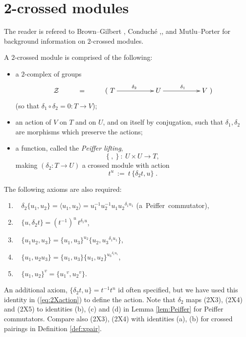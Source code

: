 
\section{2-crossed modules} \label{sect:2xmod}

The reader is refered to
Brown--Gilbert \cite{brow:gilb}, 
Conduch\'e \cite{conduche:jpaa},\cite{conduche:gmj}, 
and Mutlu--Porter \cite{mutlu:porter5} 
for background information on $2$-crossed modules.

\begin{defn} 
A $2$-crossed module is comprised of the following: 
\begin{itemize}
\item
a $2$-complex of groups
$$
\xymatrix{
\calZ 
  & = &  (~T \ar[rr]^{\delta_2} 
         &&  U \ar[rr]^{\delta_1}
             && V~) \\
}
$$
(so that  $\delta_1\circ\delta_2 = 0 : T \to V$);
\item
an action of $V$ on $T$ and on $U$, and on itself by conjugation,
such that $\delta_1, \delta_2$ are morphisms which preserve the actions;
\item
a function, called the \emph{Peiffer lifting},
$$
\{~,~\} ~:~ U \times U \to T,
$$
making $(\delta_2 : T \to U)$ a crossed module with action
\begin{equation} \label{eq:2Xaction}
t^u ~:=~ t\,\{\delta_2t,u\}\;.
\end{equation}
\end{itemize}
The following axioms are also required: 
\begin{enumerate}[{\rm (2X1)}]
\item~
$\delta_2\{u_1,u_2\} = \langle u_1, u_2 \rangle
                     = u_1^{-1} u_2^{-1} u_1 {u_2}^{\delta_1 u_1}$ 
\quad\mbox{(a Peiffer commutator)},
\item~
$\{u, \delta_2 t\} = (t^{-1})^u\, t^{\delta_1 u}$,
\item~ 
$\{u_1u_2, u_3\} = \{u_1,u_3\}^{u_2} \{u_2,{u_3}^{\delta_1 u_1}\}$,
\item~ 
$\{u_1, u_2u_3\} = \{u_1,u_3\} \{u_1,u_2\}^{{u_3}^{\delta_1 u_1}}$,
\item~ 
$\{u_1,u_2\}^v = \{{u_1}^v, {u_2}^v\}$.
\end {enumerate}
\end{defn}

\noindent
An additional axiom, $\{\delta_2t,u\} = t^{-1}t^n$ id often specified, 
but we have used this identity in (\ref{eq:2Xaction}) to define the action. 
Note that $\delta_2$ maps {(2X3)}, {(2X4)} and {(2X5)} 
to identities (b), (c) and (d) in Lemma \ref{lem:Peiffer} 
for Peiffer commutators. 
Compare also (2X3), (2X4) with identities (a), (b) for crossed pairings 
in Definition \ref{def:xpair}. 

